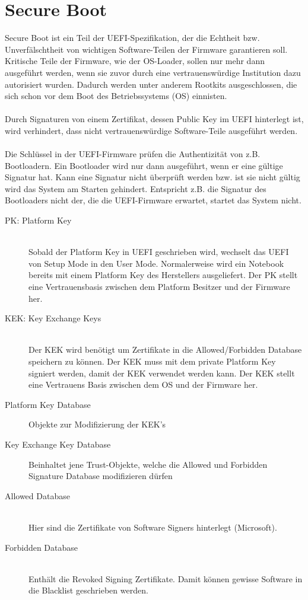 \section{Secure Boot}
Secure Boot ist ein Teil der UEFI-Spezifikation, der die Echtheit bzw. Unverfälschtheit von wichtigen Software-Teilen der Firmware garantieren soll. Kritische Teile der Firmware, wie der OS-Loader, sollen nur mehr dann ausgeführt werden, wenn sie zuvor durch eine vertrauenswürdige Institution dazu autorisiert wurden. Dadurch werden unter anderem Rootkits ausgeschlossen, die sich schon vor dem Boot des Betriebssystems (OS) einnisten.
\\ \\
Durch Signaturen von einem Zertifikat, dessen Public Key im UEFI hinterlegt ist, wird verhindert, dass nicht vertrauenswürdige Software-Teile ausgeführt werden.
\\ \\
Die Schlüssel in der UEFI-Firmware prüfen die Authentizität von z.B. Bootloadern. Ein Bootloader wird nur dann ausgeführt, wenn er eine gültige Signatur hat. Kann eine Signatur nicht überprüft werden bzw. ist sie nicht gültig wird das System am Starten gehindert. Entspricht z.B. die Signatur des Bootloaders nicht der, die die UEFI-Firmware erwartet, startet das System nicht. 
\begin{description}
	\item[PK: Platform Key]  \hfill \\
	Sobald der Platform Key in UEFI geschrieben wird, wechselt das UEFI von Setup Mode in den User Mode. Normalerweise wird ein Notebook bereits mit einem Platform Key des Herstellers ausgeliefert. Der PK stellt eine Vertrauensbasis zwischen dem Platform Besitzer und der Firmware her.
	\item[KEK: Key Exchange Keys] \hfill \\
	Der KEK wird benötigt um Zertifikate in die Allowed/Forbidden Database speichern zu können. Der KEK muss mit dem private Platform Key signiert werden, damit der KEK verwendet werden kann. Der KEK stellt eine Vertrauens Basis zwischen dem OS und der Firmware her.
	\item[Platform Key Database] Objekte zur Modifizierung der KEK's
	\item[Key Exchange Key Database] Beinhaltet jene Trust-Objekte, welche die Allowed und Forbidden Signature Database modifizieren dürfen	
	\item[Allowed Database] \hfill \\
	Hier sind die Zertifikate von Software Signers hinterlegt (Microsoft).
	\item[Forbidden Database] \hfill \\
	Enthält die Revoked Signing Zertifikate. Damit können gewisse Software in die Blacklist geschrieben werden.
\end{description}

